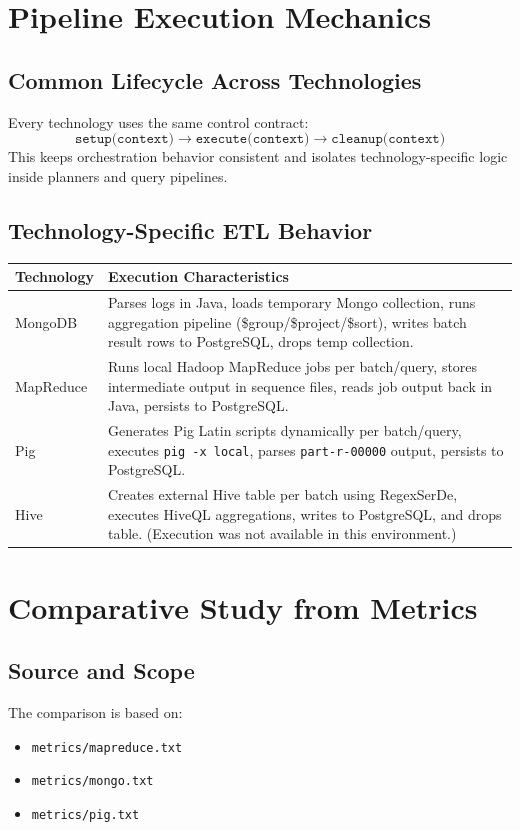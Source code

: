 \documentclass[12pt,a4paper]{article}
\begin{document}
\section{Pipeline Execution Mechanics}

\subsection{Common Lifecycle Across Technologies}
Every technology uses the same control contract:
\[
\texttt{setup(context)} \rightarrow \texttt{execute(context)} \rightarrow \texttt{cleanup(context)}
\]
This keeps orchestration behavior consistent and isolates technology-specific logic inside planners and query pipelines.

\subsection{Technology-Specific ETL Behavior}
\begin{tabular}{p{} p{}}
\toprule
\textbf{Technology} & \textbf{Execution Characteristics} \\
\midrule
MongoDB & Parses logs in Java, loads temporary Mongo collection, runs aggregation pipeline (\$group/\$project/\$sort), writes batch result rows to PostgreSQL, drops temp collection. \\
MapReduce & Runs local Hadoop MapReduce jobs per batch/query, stores intermediate output in sequence files, reads job output back in Java, persists to PostgreSQL. \\
Pig & Generates Pig Latin scripts dynamically per batch/query, executes \texttt{pig -x local}, parses \texttt{part-r-00000} output, persists to PostgreSQL. \\
Hive & Creates external Hive table per batch using RegexSerDe, executes HiveQL aggregations, writes to PostgreSQL, and drops table. (Execution was not available in this environment.) \\
\bottomrule
\end{tabular}

\section{Comparative Study from Metrics}

\subsection{Source and Scope}
The comparison is based on:
\begin{itemize}
  \item \texttt{metrics/mapreduce.txt}
  \item \texttt{metrics/mongo.txt}
  \item \texttt{metrics/pig.txt}
\end{itemize}
\end{document}
